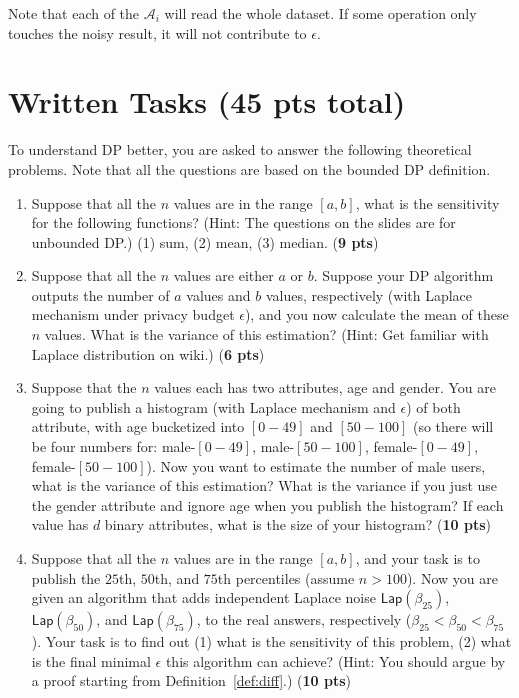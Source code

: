 \documentclass{article}
\begin{document}
Note that each of the $\mathcal{A}_i$ will read the whole dataset.  If some operation only touches the noisy result, it will not contribute to $\epsilon$. 

\section{Written Tasks (45 pts total)}
To understand DP better, you are asked to answer the following theoretical problems.  Note that all the questions are based on the bounded DP definition.
 
\begin{enumerate}

	
	\item Suppose that all the $n$ values are in the range $[a,b]$, what is the sensitivity for the following functions?  (Hint: The questions on the slides are for unbounded DP.) (1) sum, (2) mean, (3) median. (\textbf{9 pts})
	
	\item Suppose that all the $n$ values are either $a$ or $b$.  Suppose your DP algorithm outputs the number of $a$ values and $b$ values, respectively (with Laplace mechanism under privacy budget $\epsilon$), and you now calculate the mean of these $n$ values.  What is the variance of this estimation? (Hint: Get familiar with Laplace distribution on wiki.) (\textbf{6 pts})
	
	\item Suppose that the $n$ values each has two attributes, age and gender.  You are going to publish a histogram (with Laplace mechanism and $\epsilon$) of both attribute, with age bucketized into $[0-49]$ and $[50-100]$ (so there will be four numbers for: male-$[0-49]$, male-$[50-100]$, female-$[0-49]$, female-$[50-100]$).  Now you want to estimate the number of male users, what is the variance of this estimation?  What is the variance if you just use the gender attribute and ignore age when you publish the histogram?  If each value has $d$ binary attributes, what is the size of your histogram? (\textbf{10 pts})
	
	\item Suppose that all the $n$ values are in the range $[a,b]$, and your task is to publish the $25$th, $50$th, and $75$th percentiles (assume $n>100$).  Now you are given an algorithm that adds independent Laplace noise $\mathsf{Lap}\left(\beta_{25}\right)$, $\mathsf{Lap}\left(\beta_{50}\right)$, and $\mathsf{Lap}\left(\beta_{75}\right)$, to the real answers, respectively ($\beta_{25}<\beta_{50}<\beta_{75}$).  Your task is to find out (1) what is the sensitivity of this problem, (2) what is the final minimal $\epsilon$ this algorithm can achieve? (Hint: You should argue by a proof starting from Definition~\ref{def:diff}.) (\textbf{10 pts})
	

\end{enumerate}
\end{document}
